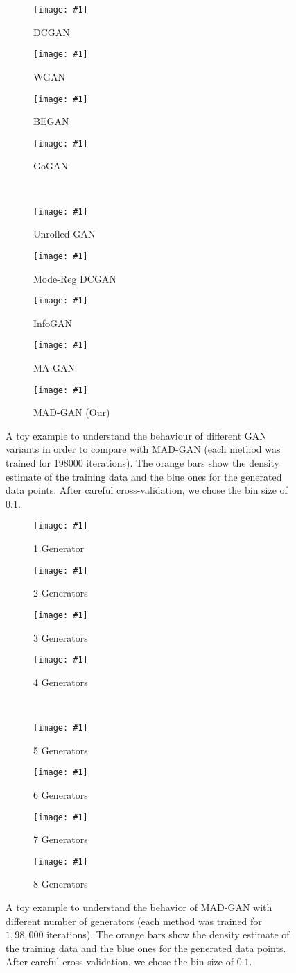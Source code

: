 \newcommand{\addSubFig}[3]{\begin{subfigure}[t]{.33\linewidth}
		\texttt{[image: \#1]}
		\caption{#2}\label{#3}\end{subfigure}
}

\newcommand{\addSubFigEighth}[3]{\begin{subfigure}[t]{.24\linewidth}
		\texttt{[image: \#1]}
		\caption{#2}\label{#3}\end{subfigure}
}

\newcommand{\addSubFigNineth}[3]{\begin{subfigure}[t]{.19\linewidth}
		\texttt{[image: \#1]}
		\caption{#2}\label{#3}\end{subfigure}
}

\begin{figure}
	\centering
	\addSubFigNineth{DCGAN_1D}{DCGAN}{fig:DCGAN_1D} 
	\addSubFigNineth{WGAN_1D}{WGAN}{fig:WGAN_1D} 
	\addSubFigNineth{BEGAN_1D}{BEGAN}{fig:BEGAN_1D} 
	\addSubFigNineth{GGAN_2nd_1D}{GoGAN}{fig:GoGAN_1D}\\ 
	\addSubFigNineth{UNROLLEDGAN_1D}{Unrolled GAN}{fig:Unrolled_1D} 
	\addSubFigNineth{MODEGAN_1D}{Mode-Reg DCGAN}{fig:ModeReg_1D} 
	\addSubFigNineth{InfoGAN_1D}{InfoGAN}{fig:InfoGAN_1D} 
	\addSubFigNineth{TRIVIAL_1D}{MA-GAN}{fig:MA-GAN_1D} 
	\addSubFigNineth{MADGAN_1D}{MAD-GAN (Our)}{fig:MAD-GAN_1D} 
	\caption{A toy example to understand the behaviour of different GAN variants in order to compare with MAD-GAN (each method was trained for 198000 iterations).  The orange bars show the density estimate of the training data and the blue ones for the generated data points. After careful cross-validation, we chose the bin size of $0.1$. }
	\label{fig:toy_1D}
	\vspace{-3mm}
\end{figure}

\begin{figure}
	\centering
	\addSubFigEighth{MADGAN_1_1D}{1 Generator}{fig:MADGAN_1} 
	\addSubFigEighth{MADGAN_2_1D}{2 Generators}{fig:MADGAN_2} 
	\addSubFigEighth{MADGAN_3_1D}{3 Generators}{fig:MADGAN_3} 
	\addSubFigEighth{MADGAN_4_1D}{4 Generators}{fig:MADGAN_4}\\ 
	\addSubFigEighth{MADGAN_5_1D}{5 Generators}{fig:MADGAN_5} 
	\addSubFigEighth{MADGAN_6_1D}{6 Generators}{fig:MADGAN_6} 
	\addSubFigEighth{MADGAN_7_1D}{7 Generators}{fig:MADGAN_7} 
	\addSubFigEighth{MADGAN_8_1D}{8 Generators}{fig:MADGAN_8} 
	\caption{A toy example to understand the behavior of MAD-GAN with different number of generators (each method was trained for $1,98,000$ iterations).  The orange bars show the density estimate of the training data and the blue ones for the generated data points. After careful cross-validation, we chose the bin size of $0.1$. }
	\label{fig:toy_1D_multi}
	\vspace{-3mm}
\end{figure}

